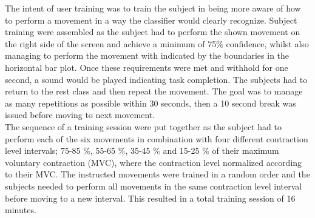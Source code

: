 The intent of user training was to train the subject in being more aware of how to perform a movement in a way the classifier would clearly recognize. Subject training were assembled as the subject had to perform the shown movement on the right side of the screen and achieve a minimum of 75\% confidence, whilst also managing to perform the movement with indicated by the boundaries in the horizontal bar plot. Once these requirements were met and withhold for one second, a sound would be played indicating task completion. The subjects had to return to the rest class and then repeat the movement. The goal was to manage as many repetitions as possible within 30 seconds, then a 10 second break was issued before moving to next movement. \\
The sequence of a training session were put together as the subject had to perform each of the six movements in combination with four different contraction level intervals; 75-85 \%, 55-65 \%, 35-45 \% and 15-25 \% of their maximum voluntary contraction (MVC), where the contraction level normalized according to their MVC. The instructed movements were trained in a random order and the subjects needed to perform all movements in the same contraction level interval before moving to a new interval. This resulted in a total training session of 16 minutes.         


